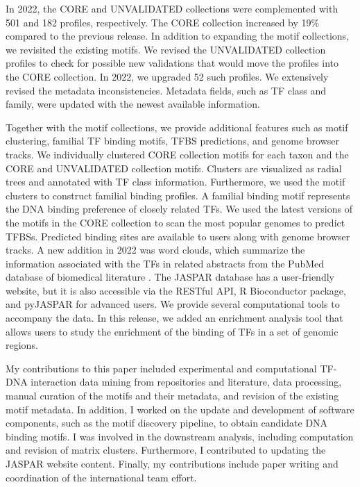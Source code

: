 In 2022, the CORE and UNVALIDATED collections were complemented with 501 and 182 profiles, respectively. The CORE collection increased by 19\% compared to the previous release. In addition to expanding the motif collections, we revisited the existing motifs. We revised the UNVALIDATED collection profiles to check for possible new validations that would move the profiles into the CORE collection. In 2022, we upgraded 52 such profiles. We extensively revised the metadata inconsistencies. Metadata fields, such as TF class and family, were updated with the newest available information.

Together with the motif collections, we provide additional features such as motif clustering, familial TF binding motifs, TFBS predictions, and genome browser tracks. We individually clustered CORE collection motifs for each taxon and the CORE and UNVALIDATED collection motifs. Clusters are visualized as radial trees and annotated with TF class information. Furthermore, we used the motif clusters to construct familial binding profiles. A familial binding motif represents the DNA binding preference of closely related TFs. We used the latest versions of the motifs in the CORE collection to scan the most popular genomes to predict TFBSs. Predicted binding sites are available to users along with genome browser tracks. A new addition in 2022 was word clouds, which summarize the information associated with the TFs in related abstracts from the PubMed database of biomedical literature \cite{canese2013pubmed}. The JASPAR database has a user-friendly website, but it is also accessible via the RESTful API, R Bioconductor package, and pyJASPAR for advanced users. We provide several computational tools to accompany the data. In this release, we added an enrichment analysis tool that allows users to study the enrichment of the binding of TFs in a set of genomic regions.

My contributions to this paper included experimental and computational TF-DNA interaction data mining from repositories and literature, data processing, manual curation of the motifs and their metadata, and revision of the existing motif metadata. In addition, I worked on the update and development of software components, such as the motif discovery pipeline, to obtain candidate DNA binding motifs. I was involved in the downstream analysis, including computation and revision of matrix clusters. Furthermore, I contributed to updating the JASPAR website content. Finally, my contributions include paper writing and coordination of the international team effort.

